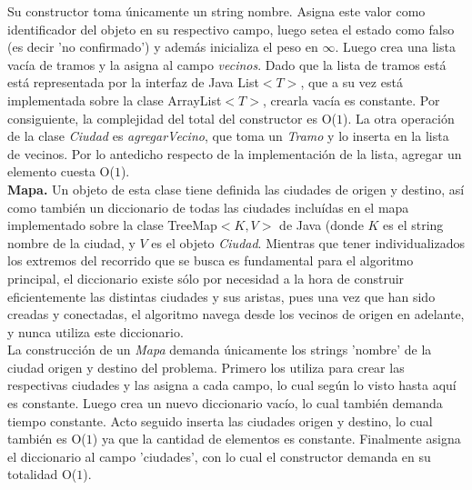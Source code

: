 \indent Su constructor toma únicamente un string nombre. Asigna este valor como identificador del objeto en su respectivo campo, luego setea el estado como falso (es decir 'no confirmado') y además inicializa el peso en  $\infty$. Luego crea una lista vacía de tramos y la asigna al campo \textsl{vecinos}. Dado que la lista de tramos está está representada por la interfaz de Java List$<T>$, que a su vez está implementada sobre la clase ArrayList$<T>$, crearla vacía es constante. Por consiguiente, la complejidad del total del constructor es O($1$). La otra operación de la clase \textsl{Ciudad} es \textsl{agregarVecino}, que toma un \textsl{Tramo} y lo inserta en la lista de vecinos. Por lo antedicho respecto de la implementación de la lista, agregar un elemento cuesta O($1$).\\
\indent \textbf{Mapa.} Un objeto de esta clase tiene definida las ciudades de origen y destino, así como también un diccionario de todas las ciudades incluídas en el mapa implementado sobre la clase TreeMap$<K,V>$ de Java (donde $K$ es el string nombre de la ciudad, y $V$ es el objeto \textsl{Ciudad}. Mientras que tener individualizados los extremos del recorrido que se busca es fundamental para el algoritmo principal, el diccionario existe sólo por necesidad a la hora de construir eficientemente las distintas ciudades y sus aristas, pues una vez que han sido creadas y conectadas, el algoritmo navega desde los vecinos de origen en adelante, y nunca utiliza este diccionario.\\
\indent La construcción de un \textsl{Mapa} demanda únicamente los strings 'nombre' de la ciudad origen y destino del problema. Primero los utiliza para crear las respectivas ciudades y las asigna a cada campo, lo cual según lo visto hasta aquí es constante. Luego crea un nuevo diccionario vacío, lo cual también demanda tiempo constante. Acto seguido inserta las ciudades origen y destino, lo cual también es O($1$) ya que la cantidad de elementos es constante. Finalmente asigna el diccionario al campo 'ciudades', con lo cual el constructor demanda en su totalidad O($1$).\\

